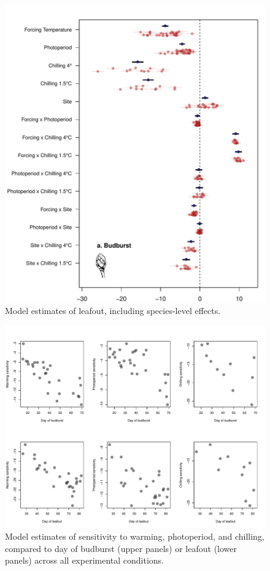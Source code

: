 \documentclass{article}
\begin{document}
\begin{figure}
\label{figS3}
\includegraphics[width=1\textwidth, page=2]{Fig1_bb_lo+sp}
\caption{Model estimates of leafout, including species-level effects.}
\end{figure}

\begin{figure}
\label{figS4}
\includegraphics[width=1\textwidth]{Sens_vs_day}
\caption{Model estimates of sensitivity to warming, photoperiod, and chilling, compared to day of budburst (upper panels) or leafout (lower panels) across all experimental conditions.}
\end{figure}
\end{document}
